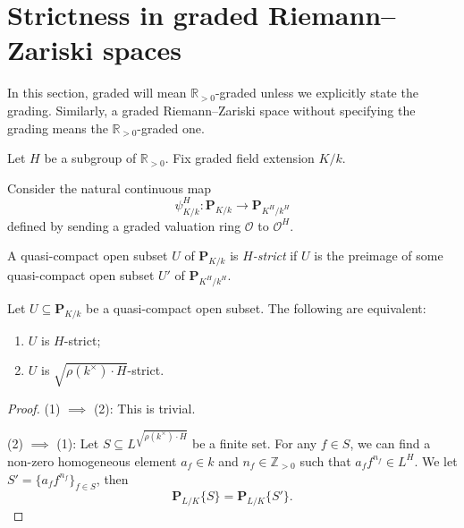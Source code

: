 \section{Strictness in graded Riemann--Zariski spaces}\label{sec-strictnessinRZ}
In this section, graded will mean $\mathbb{R}_{>0}$-graded unless we explicitly state the grading. Similarly, a graded Riemann--Zariski space without specifying the grading means the $\mathbb{R}_{>0}$-graded one.

Let $H$ be a subgroup of $\mathbb{R}_{>0}$. Fix graded field extension $K/k$.





\begin{definition}\label{def-psiKkHstrict}
    Consider the natural continuous map
    \[
        \psi_{K/k}^H:\mathbf{P}_{K/k}\rightarrow   \mathbf{P}_{K^H/k^H}
    \]
    defined by sending a graded valuation ring $\mathcal{O}$ to $\mathcal{O}^H$.

    A quasi-compact open subset $U$ of $\mathbf{P}_{K/k}$ is \emph{$H$-strict} if $U$ is the preimage of some quasi-compact open subset $U'$ of $\mathbf{P}_{K^H/k^H}$.
\end{definition}



\begin{lemma}\label{lma-Hstrictsqrt}
    Let $U\subseteq \mathbf{P}_{K/k}$ be a quasi-compact open subset.
    The following are equivalent:
    \begin{enumerate}
        \item $U$ is $H$-strict;
        \item $U$ is $\sqrt{\rho(k^{\times})\cdot H}$-strict.
    \end{enumerate}
\end{lemma}
\begin{proof}
    (1) $\implies$ (2): This is trivial.

    (2) $\implies$ (1): Let $S\subseteq L^{\sqrt{\rho(k^{\times})\cdot H}}$ be a finite set. For any $f\in S$, we can find a non-zero homogeneous element $a_f\in k$ and $n_f\in \mathbb{Z}_{>0}$ such that $a_ff^{n_f}\in L^{H}$. We let $S'=\{a_ff^{n_f}\}_{f\in S}$, then 
    \[
        \mathbf{P}_{L/K}\{S\}= \mathbf{P}_{L/K}\{S'\}.
    \]
\end{proof}

